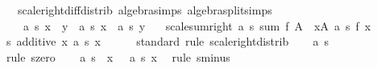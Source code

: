 \begin{isabellebody}
\ \ \ scale{\isacharunderscore}{\kern0pt}right{\isacharunderscore}{\kern0pt}diff{\isacharunderscore}{\kern0pt}distrib\ {\isacharbrackleft}{\kern0pt}algebra{\isacharunderscore}{\kern0pt}simps{\isacharcomma}{\kern0pt}\ algebra{\isacharunderscore}{\kern0pt}split{\isacharunderscore}{\kern0pt}simps{\isacharbrackright}{\kern0pt}{\isacharcolon}{\kern0pt}\ \isanewline
\ \ \ \ {\isachardoublequoteopen}a\ {\isacharasterisk}{\kern0pt}s\ {\isacharparenleft}{\kern0pt}x\ {\isacharminus}{\kern0pt}\ y{\isacharparenright}{\kern0pt}\ {\isacharequal}{\kern0pt}\ a\ {\isacharasterisk}{\kern0pt}s\ x\ {\isacharminus}{\kern0pt}\ a\ {\isacharasterisk}{\kern0pt}s\ y{\isachardoublequoteclose}\isanewline
\ \ \ scale{\isacharunderscore}{\kern0pt}sum{\isacharunderscore}{\kern0pt}right{\isacharcolon}{\kern0pt}\ {\isachardoublequoteopen}a\ {\isacharasterisk}{\kern0pt}s\ {\isacharparenleft}{\kern0pt}sum\ f\ A{\isacharparenright}{\kern0pt}\ {\isacharequal}{\kern0pt}\ {\isacharparenleft}{\kern0pt}{\isasymSum}x{\isasymin}A{\isachardot}{\kern0pt}\ a\ {\isacharasterisk}{\kern0pt}s\ {\isacharparenleft}{\kern0pt}f\ x{\isacharparenright}{\kern0pt}{\isacharparenright}{\kern0pt}{\isachardoublequoteclose}\isanewline
%
\isadelimproof
%
\endisadelimproof
%
\isatagproof
{}\isamarkupfalse%
\ {\isacharminus}{\kern0pt}\isanewline
\ \ \isamarkupfalse%
\ s{\isacharcolon}{\kern0pt}\ additive\ {\isachardoublequoteopen}{\isasymlambda}x{\isachardot}{\kern0pt}\ a\ {\isacharasterisk}{\kern0pt}s\ x{\isachardoublequoteclose}\isanewline
\ \ \ \ \isamarkupfalse%
\ standard\ {\isacharparenleft}{\kern0pt}rule\ scale{\isacharunderscore}{\kern0pt}right{\isacharunderscore}{\kern0pt}distrib{\isacharparenright}{\kern0pt}\isanewline
\ \ \isamarkupfalse%
\ {\isachardoublequoteopen}a\ {\isacharasterisk}{\kern0pt}s\ {}\ {\isacharequal}{\kern0pt}\ {}{\isachardoublequoteclose}\ \isamarkupfalse%
\ {\isacharparenleft}{\kern0pt}rule\ s{\isachardot}{\kern0pt}zero{\isacharparenright}{\kern0pt}\isanewline
\ \ \isamarkupfalse%
\ {\isachardoublequoteopen}a\ {\isacharasterisk}{\kern0pt}s\ {\isacharparenleft}{\kern0pt}{\isacharminus}{\kern0pt}\ x{\isacharparenright}{\kern0pt}\ {\isacharequal}{\kern0pt}\ {\isacharminus}{\kern0pt}\ {\isacharparenleft}{\kern0pt}a\ {\isacharasterisk}{\kern0pt}s\ x{\isacharparenright}{\kern0pt}{\isachardoublequoteclose}\ \isamarkupfalse%
\ {\isacharparenleft}{\kern0pt}rule\ s{\isachardot}{\kern0pt}minus{\isacharparenright}{\kern0pt}\isanewline

\end{isabellebody}
